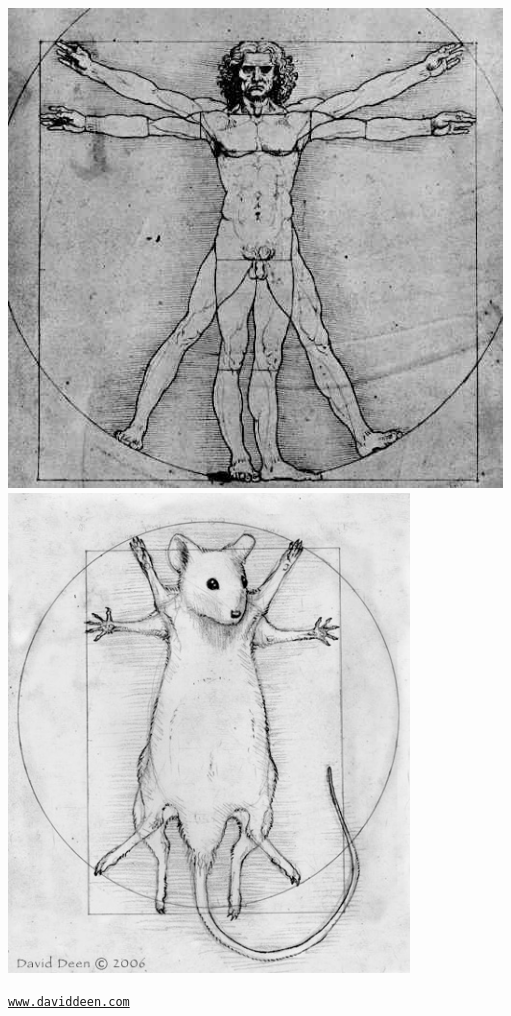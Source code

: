 \documentclass[12pt]{article}
\newcommand{\smallestsize}{\fontsize{18}{22} \selectfont}
\begin{document}
\centerline{
\includegraphics[height=5in]{Figs/da-vinci-man.jpg}
\includegraphics[height=5in]{Figs/vitruvian_mouse.jpg}
}

{\color{myblue} \smallestsize \hfill
  \href{http://www.daviddeen.com}{\tt www.daviddeen.com} \hspace*{11mm}}
\end{document}
